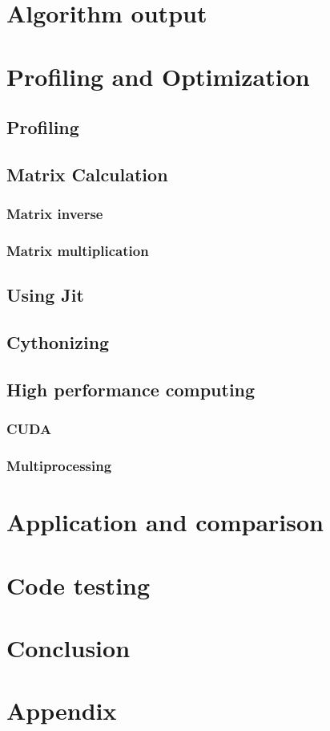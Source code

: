 \documentclass{article}
\begin{document}
\section{Algorithm output}





\section{Profiling and Optimization}
\subsection{Profiling}
\subsection{Matrix Calculation}
\subsubsection{Matrix inverse}
\subsubsection{Matrix multiplication}
\subsection{Using Jit}
\subsection{Cythonizing}
\subsection{High performance computing}
\subsubsection{CUDA}
\subsubsection{Multiprocessing}
\section{Application and comparison}
\section{Code testing}
\section{Conclusion}
\section{Appendix}
\end{document}
